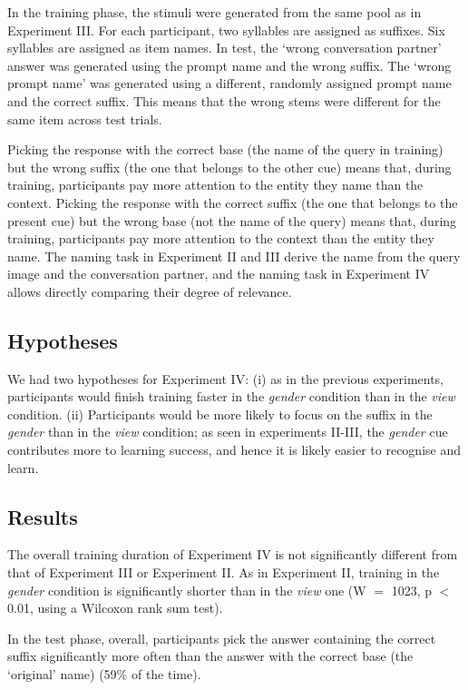 \documentclass{frontiersSCNS} %
\begin{document}
In the training phase, the stimuli were generated from the same pool as in Experiment III. For each participant, two syllables are assigned as suffixes. Six syllables are assigned as item names. In test, the `wrong conversation partner' answer was generated using the prompt name and the wrong suffix. The `wrong prompt name' was generated using a different, randomly assigned prompt name and the correct suffix. This means that the wrong stems were different for the same item across test trials.


Picking the response with the correct base (the name of the query in training) but the wrong suffix (the one that belongs to the other cue) means that, during training, participants pay more attention to the entity they name than the context. Picking the response with the correct suffix (the one that belongs to the present cue) but the wrong base (not the name of the query) means that, during training, participants pay more attention to the context than the entity they name. The naming task in Experiment II and III derive the name from the query image and the conversation partner, and the naming task in Experiment IV allows directly comparing their degree of relevance.

\subsection{Hypotheses}

We had two hypotheses for Experiment IV: (i) as in the previous experiments, participants would finish training faster in the \emph{gender} condition than in the \emph{view} condition. (ii) Participants would be more likely to focus on the suffix in the \emph{gender} than in the \emph{view} condition; as seen in experiments II-III, the \emph{gender} cue contributes more to learning success, and hence it is likely easier to recognise and learn.

\subsection{Results}

The overall training duration of Experiment IV is not significantly different from that of Experiment III or Experiment II. As in Experiment II, training in the \emph{gender} condition is significantly shorter than in the \emph{view} one (W $=$ 1023, p $<$ 0.01, using a Wilcoxon rank sum test). 

In the test phase, overall, participants pick the answer containing the correct suffix  significantly more often than the answer with the correct base (the `original' name) (59\% of the time).
\end{document}
